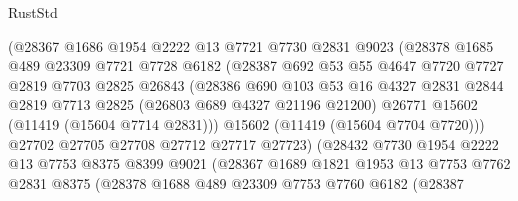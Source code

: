\begin{lexlean}{RustStd}
\begin{coremodule}
                      (@28367
                        @1686
                        @1954
                        @2222
                        @13
                        @7721
                        @7730
                        @2831
                        @9023
                        (@28378
                          @1685
                          @489
                          @23309
                          @7721
                          @7728
                          @6182
                          (@28387
                            @692
                            @53
                            @55
                            @4647
                            @7720
                            @7727
                            @2819
                            @7703
                            @2825
                            @26843
                            (@28386
                              @690
                              @103
                              @53
                              @16
                              @4327
                              @2831
                              @2844
                              @2819
                              @7713
                              @2825
                              (@26803 @689 @4327 @21196 @21200)
                              @26771
                              @15602
                              (@11419 (@15604 @7714 @2831)))
                            @15602
                            (@11419 (@15604 @7704 @7720)))
                          @27702
                          @27705
                          @27708
                          @27712
                          @27717
                          @27723)
                        (@28432
                          @7730
                          @1954
                          @2222
                          @13
                          @7753
                          @8375
                          @8399
                          @9021
                          (@28367
                            @1689
                            @1821
                            @1953
                            @13
                            @7753
                            @7762
                            @2831
                            @8375
                            (@28378
                              @1688
                              @489
                              @23309
                              @7753
                              @7760
                              @6182
                              (@28387

\end{coremodule}
\end{lexlean}
